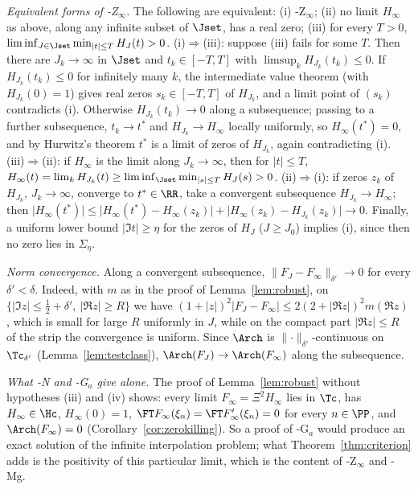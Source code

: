 \emph{Equivalent forms of \hyp{Z$_\infty$}.} The following are equivalent:
(i) \hyp{Z$_\infty$};
(ii) no limit $H_\infty$ as above, along any infinite subset of $\Jset$, has a real zero;
(iii) for every $T>0$, $\liminf_{J\in\Jset}\min_{\lvert t\rvert\le T}H_J(t)>0$.
(i)$\Rightarrow$(iii): suppose (iii) fails for some $T$. Then there are $J_k\to\infty$ in $\Jset$ and $t_k\in[-T,T]$ with
$\limsup_kH_{J_k}(t_k)\le0$. If $H_{J_k}(t_k)\le0$ for infinitely many $k$, the intermediate value theorem (with
$H_{J_k}(0)=1$) gives real zeros $s_k\in[-T,T]$ of $H_{J_k}$, and a limit point of $(s_k)$ contradicts (i). Otherwise
$H_{J_k}(t_k)\to0$ along a subsequence; passing to a further subsequence, $t_k\to t^*$ and $H_{J_k}\to H_\infty$ locally
uniformly, so $H_\infty(t^*)=0$, and by Hurwitz's theorem \cite[VII.2.5]{Con73} $t^*$ is a limit of zeros of $H_{J_k}$,
again contradicting (i).
(iii)$\Rightarrow$(ii): if $H_\infty$ is the limit along $J_k\to\infty$, then for $\lvert t\rvert\le T$,
$H_\infty(t)=\lim_kH_{J_k}(t)\ge\liminf_{\Jset}\min_{\lvert s\rvert\le T}H_J(s)>0$.
(ii)$\Rightarrow$(i): if zeros $z_k$ of $H_{J_k}$, $J_k\to\infty$, converge to $t^*\in\RR$, take a convergent subsequence
$H_{J_k}\to H_\infty$; then $\lvert H_\infty(t^*)\rvert\le\lvert H_\infty(t^*)-H_\infty(z_k)\rvert+\lvert H_\infty(z_k)-H_{J_k}(z_k)\rvert\to0$.
Finally, a uniform lower bound $\lvert\Im t\rvert\ge\eta$ for the zeros of $H_J$ ($J\ge J_0$) implies (i), since then no zero lies in $\Sigma_\eta$.

\emph{Norm convergence.} Along a convergent subsequence, $\lVert F_J-F_\infty\rVert_{\delta'}\to0$ for every $\delta'<\delta$. Indeed,
with $m$ as in the proof of Lemma~\ref{lem:robust}, on $\{\lvert\Im z\rvert\le\frac12+\delta',\ \lvert\Re z\rvert\ge R\}$ we have
$(1+\lvert z\rvert)^2\lvert F_J-F_\infty\rvert\le2(2+\lvert\Re z\rvert)^2m(\Re z)$, which is small for large $R$ uniformly in $J$, while on
the compact part $\lvert\Re z\rvert\le R$ of the strip the convergence is uniform. Since $\Arch$ is $\lVert\cdot\rVert_{\delta'}$-continuous
on $\Tc_{\delta'}$ (Lemma~\ref{lem:testclass}), $\Arch(F_J)\to\Arch(F_\infty)$ along the subsequence.

\emph{What \hyp{N} and \hyp{G$_a$} give alone.} The proof of Lemma~\ref{lem:robust} without hypotheses (iii) and (iv) shows:
every limit $F_\infty=\Xi^2H_\infty$ lies in $\Tc$, has $H_\infty\in\Hc$, $H_\infty(0)=1$, $\FT F_\infty(\xi_n)=\FT F'_\infty(\xi_n)=0$
for every $n\in\PP$, and $\Arch(F_\infty)=0$ (Corollary~\ref{cor:zerokilling}). So a proof of \hyp{G$_a$} would produce an exact
solution of the infinite interpolation problem; what Theorem~\ref{thm:criterion} adds is the positivity of this particular limit,
which is the content of \hyp{Z$_\infty$} and \hyp{Mg}.

